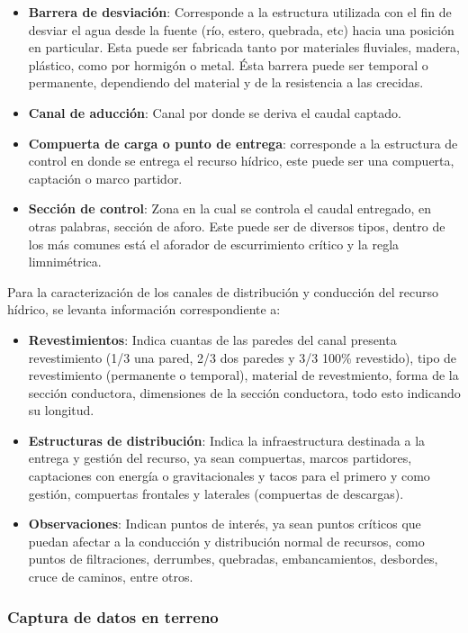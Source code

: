 \documentclass[]{article}
\begin{document}
\begin{itemize}
\item{\bfseries {Barrera de desviación}}: Corresponde a la estructura utilizada con el fin de desviar el agua desde la fuente (río, estero, quebrada, etc) hacia una posición en particular. Esta puede ser fabricada tanto por materiales fluviales, madera, plástico, como por hormigón o metal. Ésta barrera puede ser temporal o permanente, dependiendo del material y de la resistencia a las crecidas.
\item{\bfseries {Canal de aducción}}: Canal por donde se deriva el caudal captado.
\item{\bfseries {Compuerta de carga o punto de entrega}}: corresponde a la estructura de control en donde se entrega el recurso hídrico, este puede ser una compuerta, captación o marco partidor.
\item{\bfseries {Sección de control}}: Zona en la cual se controla el caudal entregado, en otras palabras, sección de aforo. Este puede ser de diversos tipos, dentro de los más comunes está el aforador de escurrimiento crítico y la regla limnimétrica.
\end{itemize}

Para la caracterización de los canales de distribución y conducción del recurso hídrico, se levanta información correspondiente a:
\begin{itemize}
\item{\bfseries {Revestimientos}}: Indica cuantas de las paredes del canal presenta revestimiento (1/3 una pared, 2/3 dos paredes y 3/3 100\% revestido), tipo de revestimiento (permanente o temporal), material de revestmiento, forma de la sección conductora, dimensiones de la sección conductora, todo esto indicando su longitud.
\item{\bfseries {Estructuras de distribución}}: Indica la infraestructura destinada a la entrega y gestión del recurso, ya sean compuertas, marcos partidores, captaciones con energía o gravitacionales y tacos para el primero y como gestión, compuertas frontales y laterales (compuertas de descargas).
\item{\bfseries {Observaciones}}: Indican puntos de interés, ya sean puntos críticos que puedan afectar a la conducción y distribución normal de recursos, como puntos de filtraciones, derrumbes, quebradas, embancamientos, desbordes, cruce de caminos, entre otros.
\end{itemize}


\subsubsection{Captura de datos en terreno}
\end{document}
